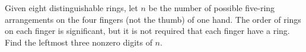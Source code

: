 Given eight distinguishable rings, let $n$ be the number of possible five-ring arrangements on the four fingers (not the thumb) of one hand.  The order of rings on each finger is significant, but it is not required that each finger have a ring.  Find the leftmost three nonzero digits of $n.$
